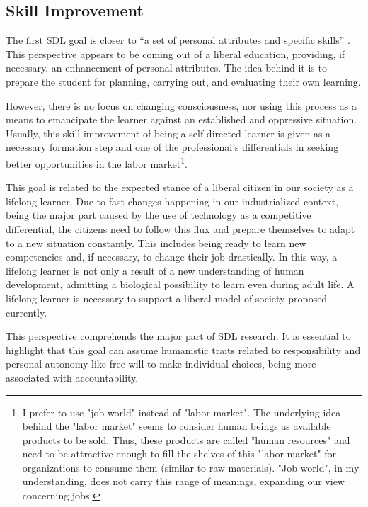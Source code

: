 \subsection{Skill Improvement}
\label{sdl-goal-ss:skill}

The first \gls{SDL} goal is closer to “a set of personal attributes and specific skills” \cite[p.~107]{merriam:2007}. This perspective appears to be coming out of a liberal education, providing, if necessary, an enhancement of personal attributes. The idea behind it is to prepare the student for planning, carrying out, and evaluating their own learning. 

However, there is no focus on changing consciousness, nor using this process as a means to emancipate the learner against an established and oppressive situation. Usually, this skill improvement of being a self-directed learner is given as a necessary formation step and one of the professional’s differentials in seeking better opportunities in the labor market\footnote{I prefer to use "job world" instead of "labor market". The underlying idea behind the "labor market" seems to consider human beings as available products to be sold. Thus, these products are called "human resources" and need to be attractive enough to fill the shelves of this "labor market" for organizations to consume them (similar to raw materials). "Job world", in my understanding, does not carry this range of meanings, expanding our view concerning jobs.}.

This goal is related to the expected stance of a liberal citizen in our society as a lifelong learner. Due to fast changes happening in our industrialized context, being the major part caused by the use of technology as a competitive differential, the citizens need to follow this flux and prepare themselves to adapt to a new situation constantly. This includes being ready to learn new competencies and, if necessary, to change their job drastically. In this way, a lifelong learner is not only a result of a new understanding of human development, admitting a biological possibility to learn even during adult life. A lifelong learner is necessary to support a liberal model of society proposed currently.

This perspective comprehends the major part of \gls{SDL} research. It is essential to highlight that this goal can assume humanistic traits related to responsibility and personal autonomy like free will to make individual choices, being more associated with accountability.

                
